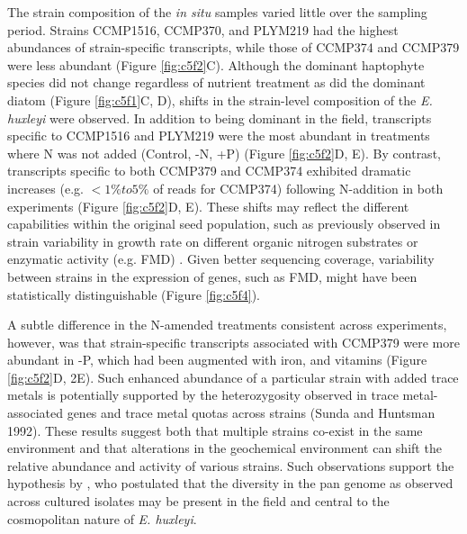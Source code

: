 The strain composition of the \textit{in situ} samples varied little over the sampling period. Strains CCMP1516, CCMP370, and PLYM219 had the highest abundances of strain-specific transcripts, while those of CCMP374 and CCMP379 were less abundant (Figure \ref{fig:c5f2}C). Although the dominant haptophyte species did not change regardless of nutrient treatment as did the dominant diatom (Figure \ref{fig:c5f1}C, D), shifts in the strain-level composition of the \textit{E. huxleyi} were observed. In addition to being dominant in the field, transcripts specific to CCMP1516 and PLYM219 were the most abundant in treatments where N was not added (Control, -N, +P) (Figure \ref{fig:c5f2}D, E). By contrast, transcripts specific to both CCMP379 and CCMP374 exhibited dramatic increases (e.g. $<1\% to 5\%$ of reads for CCMP374) following N-addition in both experiments (Figure \ref{fig:c5f2}D, E). These shifts may reflect the different capabilities within the original seed population, such as previously observed in strain variability in growth rate on different organic nitrogen substrates \citep{Strom2009} or enzymatic activity (e.g. FMD) \citep{Palenik1997, Bruhn2010}. Given better sequencing coverage, variability between strains in the expression of genes, such as FMD, might have been statistically distinguishable (Figure \ref{fig:c5f4}).\par

A subtle difference in the N-amended treatments consistent across experiments, however, was that strain-specific transcripts associated with CCMP379 were more abundant in -P, which had been augmented with iron, and vitamins (Figure \ref{fig:c5f2}D, 2E). Such enhanced abundance of a particular strain with added trace metals is potentially supported by the heterozygosity observed in trace metal-associated genes \citep{Read2013} and trace metal quotas across strains (Sunda and Huntsman 1992). These results suggest both that multiple strains co-exist in the same environment and that alterations in the geochemical environment can shift the relative abundance and activity of various strains. Such observations support the hypothesis by \citet{Read2013}, who postulated that the diversity in the pan genome as observed across cultured isolates may be present in the field and central to the cosmopolitan nature of \textit{E. huxleyi}. \par


